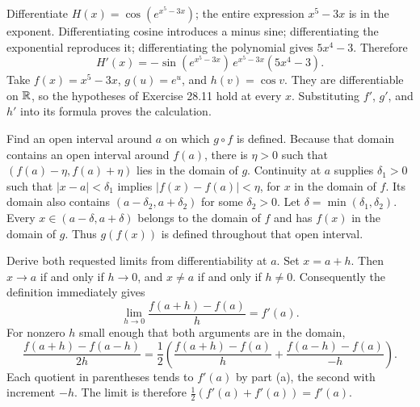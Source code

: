 \goal Differentiate $H(x)=\cos(e^{x^5-3x})$; the entire expression $x^5-3x$ is in the exponent.
Differentiating cosine introduces a minus sine; differentiating the exponential reproduces it; differentiating the polynomial gives $5x^4-3$. Therefore
\[
 H'(x)=-\sin(e^{x^5-3x})\,e^{x^5-3x}(5x^4-3).
\]
Take $f(x)=x^5-3x$, $g(u)=e^u$, and $h(v)=\cos v$. They are differentiable on $\mathbb{R}$, so the hypotheses of Exercise 28.11 hold at every $x$. Substituting $f'$, $g'$, and $h'$ into its formula proves the calculation.

\goal Find an open interval around $a$ on which $g\circ f$ is defined.
Because that domain contains an open interval around $f(a)$, there is $\eta>0$ such that $(f(a)-\eta,f(a)+\eta)$ lies in the domain of $g$.
Continuity at $a$ supplies $\delta_1>0$ such that $|x-a|<\delta_1$ implies $|f(x)-f(a)|<\eta$, for $x$ in the domain of $f$. Its domain also contains $(a-\delta_2,a+\delta_2)$ for some $\delta_2>0$. Let $\delta=\min(\delta_1,\delta_2)$. Every $x\in(a-\delta,a+\delta)$ belongs to the domain of $f$ and has $f(x)$ in the domain of $g$. Thus $g(f(x))$ is defined throughout that open interval.

\goal Derive both requested limits from differentiability at $a$.
Set $x=a+h$. Then $x\to a$ if and only if $h\to0$, and $x\ne a$ if and only if $h\ne0$. Consequently the definition immediately gives
\[
 \lim_{h\to0}\frac{f(a+h)-f(a)}h=f'(a).
\]
For nonzero $h$ small enough that both arguments are in the domain,
\[
 \frac{f(a+h)-f(a-h)}{2h}
 =\frac12\left(\frac{f(a+h)-f(a)}h+
                    \frac{f(a-h)-f(a)}{-h}\right).
\]
Each quotient in parentheses tends to $f'(a)$ by part (a), the second with increment $-h$. The limit is therefore $\tfrac12(f'(a)+f'(a))=f'(a)$.

